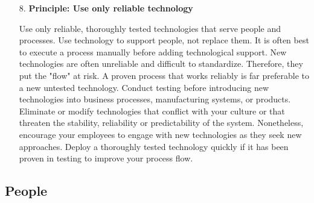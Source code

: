 \documentclass[11pt,a4paper]{article}
\begin{document}
\begin{enumerate}
\item[8.] \textbf{Principle: Use only reliable technology}

  Use only reliable, thoroughly tested technologies that serve people and
  processes. Use technology to support people, not replace them. It is often
  best to execute a process manually before adding technological support. New
  technologies are often unreliable and difficult to standardize. Therefore,
  they put the "flow" at risk. A proven process that works reliably is far
  preferable to a new untested technology. Conduct testing before introducing
  new technologies into business processes, manufacturing systems, or
  products. Eliminate or modify technologies that conflict with your culture
  or that threaten the stability, reliability or predictability of the system.
  Nonetheless, encourage your employees to engage with new technologies as
  they seek new approaches. Deploy a thoroughly tested technology quickly if
  it has been proven in testing to improve your process flow.
\end{enumerate}

\subsection{People}
\end{document}
